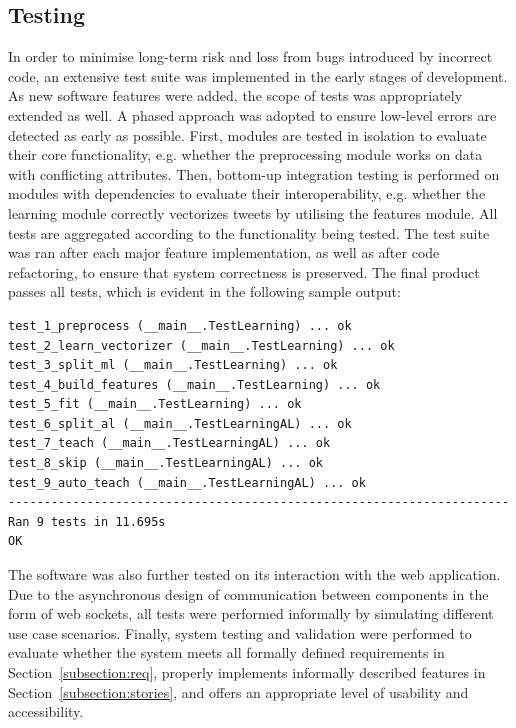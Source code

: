 \documentclass[a4paper,12pt]{article}
\begin{document}
\subsection{Testing}
In order to minimise long-term risk and loss from bugs introduced by incorrect code, an extensive test suite was implemented in the early stages of development. As new software features were added, the scope of tests was appropriately extended as well. A phased approach was adopted to ensure low-level errors are detected as early as possible. First, modules are tested in isolation to evaluate their core functionality, e.g. whether the preprocessing module works on data with conflicting attributes. Then, bottom-up integration testing is performed on modules with dependencies to evaluate their interoperability, e.g. whether the learning module correctly vectorizes tweets by utilising the features module. All tests are aggregated according to the functionality being tested.
The test suite was ran after each major feature implementation, as well as after code refactoring, to ensure that system correctness is preserved. The final product passes all tests, which is evident in the following sample output:
\begin{verbatim}
test_1_preprocess (__main__.TestLearning) ... ok
test_2_learn_vectorizer (__main__.TestLearning) ... ok
test_3_split_ml (__main__.TestLearning) ... ok
test_4_build_features (__main__.TestLearning) ... ok
test_5_fit (__main__.TestLearning) ... ok
test_6_split_al (__main__.TestLearningAL) ... ok
test_7_teach (__main__.TestLearningAL) ... ok
test_8_skip (__main__.TestLearningAL) ... ok
test_9_auto_teach (__main__.TestLearningAL) ... ok
----------------------------------------------------------------------
Ran 9 tests in 11.695s
OK
\end{verbatim}
The software was also further tested on its interaction with the web application. Due to the asynchronous design of communication between components in the form of web sockets, all tests were performed informally by simulating different use case scenarios.
Finally, system testing and validation were performed to evaluate whether the system meets all formally defined requirements in Section~\ref{subsection:req}, properly implements informally described features in Section~\ref{subsection:stories}, and offers an appropriate level of usability and accessibility.
\end{document}
